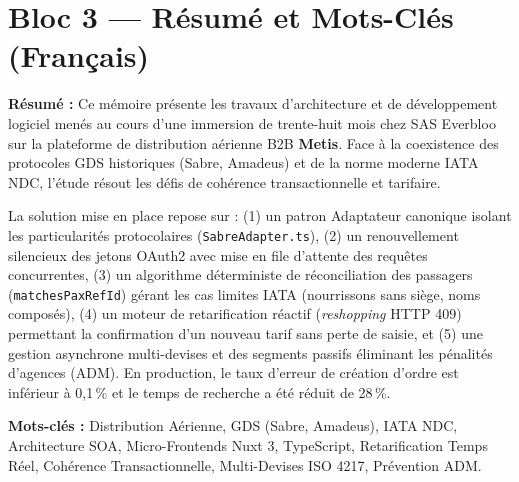 \documentclass[11pt,a4paper]{article}
\begin{document}
\section*{Bloc 3 — Résumé et Mots-Clés (Français)}
\begin{tcolorbox}[colback=LightGray, colframe=DarkSlate, arc=4pt, boxrule=0.8pt]
\textbf{Résumé :} Ce mémoire présente les travaux d'architecture et de développement logiciel menés au cours d'une immersion de trente-huit mois chez SAS Everbloo sur la plateforme de distribution aérienne B2B \textbf{Metis}. Face à la coexistence des protocoles GDS historiques (Sabre, Amadeus) et de la norme moderne IATA NDC, l'étude résout les défis de cohérence transactionnelle et tarifaire.

La solution mise en place repose sur : (1) un patron Adaptateur canonique isolant les particularités protocolaires (\texttt{SabreAdapter.ts}), (2) un renouvellement silencieux des jetons OAuth2 avec mise en file d'attente des requêtes concurrentes, (3) un algorithme déterministe de réconciliation des passagers (\texttt{matchesPaxRefId}) gérant les cas limites IATA (nourrissons sans siège, noms composés), (4) un moteur de retarification réactif (\textit{reshopping} HTTP 409) permettant la confirmation d'un nouveau tarif sans perte de saisie, et (5) une gestion asynchrone multi-devises et des segments passifs éliminant les pénalités d'agences (ADM). En production, le taux d'erreur de création d'ordre est inférieur à 0,1\,\% et le temps de recherche a été réduit de 28\,\%.

\vspace{0.2cm}
\textbf{Mots-clés :} Distribution Aérienne, GDS (Sabre, Amadeus), IATA NDC, Architecture SOA, Micro-Frontends Nuxt 3, TypeScript, Retarification Temps Réel, Cohérence Transactionnelle, Multi-Devises ISO 4217, Prévention ADM.
\end{tcolorbox}

\vspace{0.4cm}
\end{document}
